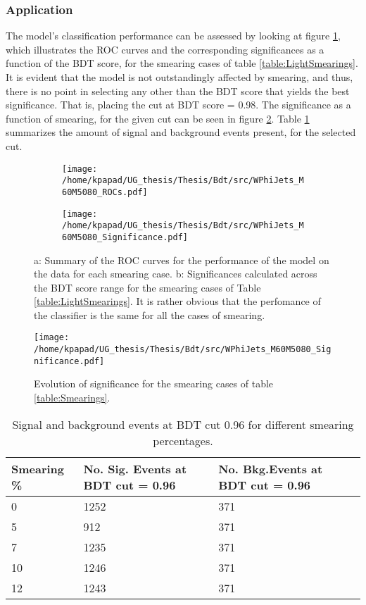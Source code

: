 \subsubsection{Application}
\label{sec:org61f9a6a}
The model's classification performance can be assessed by looking at figure \ref{fig:LightROCSIG}, which illustrates the ROC curves and the corresponding significances as a function of the BDT score, for the smearing cases of table \ref{table:LightSmearings}. It is evident that the model is not outstandingly affected by smearing, and thus, there is no point in selecting any other than the BDT score that yields the best significance. That is, placing the cut at BDT score = 0.98. The significance as a function of smearing, for the given cut can be seen in figure \ref{fig:LightSigEvolBDT}. Table \ref{table:LightNumSIGBKG} summarizes the amount of signal and background events present, for the selected cut.
\begin{figure}[h!]
\centering
\begin{subfigure}{0.49\textwidth}
\centering
\texttt{[image: /home/kpapad/UG\_thesis/Thesis/Bdt/src/WPhiJets\_M60M5080\_ROCs.pdf]}
\caption{}
\end{subfigure}
\begin{subfigure}{0.49\textwidth}
\centering
\texttt{[image: /home/kpapad/UG\_thesis/Thesis/Bdt/src/WPhiJets\_M60M5080\_Significance.pdf]}
\caption{}
\end{subfigure}
\caption{a: Summary of the ROC curves for the performance of the model on the data for each smearing case. b: Significances calculated across the BDT score range for the smearing cases of Table \ref{table:LightSmearings}. It is rather obvious that the perfomance of the classifier is the same for all the cases of smearing. }
\label{fig:LightROCSIG}
\end{figure}

\begin{figure}[h!]
\centering
\texttt{[image: /home/kpapad/UG\_thesis/Thesis/Bdt/src/WPhiJets\_M60M5080\_Significance.pdf]}
\caption{Evolution of significance for the smearing cases of table \ref{table:Smearings}. }
\label{fig:LightSigEvolBDT}
\end{figure}

\begin{table}[ht]
\centering
\begin{tabular}{|p{2cm}|p{3cm}|p{3cm}|}
 \hline
Smearing \%  & No. Sig. Events at BDT cut = 0.96 & No. Bkg.Events at BDT cut = 0.96 \\
\hline
0 & 1252 & 371 \\
5 & 912 & 371 \\
7 & 1235 & 371 \\
10 & 1246 & 371 \\
12 & 1243 & 371 \\
 \hline
\end{tabular}
\caption{Signal and background events at BDT cut 0.96 for different smearing percentages.}
\label{table:LightNumSIGBKG}
\end{table}
